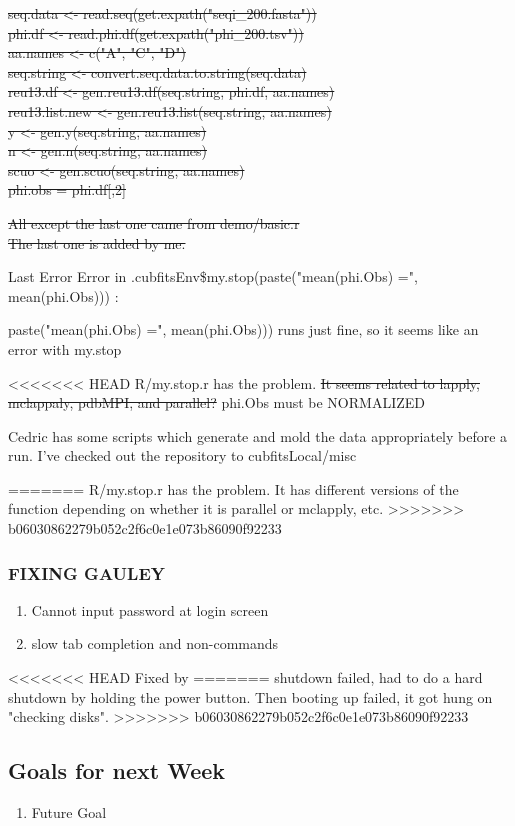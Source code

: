 \documentclass[11pt]{article} %
\begin{document}
\sout{seq.data <- read.seq(get.expath("seqi\_200.fasta"))\\
phi.df <- read.phi.df(get.expath("phi\_200.tsv"))\\
aa.names <- c("A", "C", "D")\\
seq.string <- convert.seq.data.to.string(seq.data)\\
reu13.df <- gen.reu13.df(seq.string, phi.df, aa.names)\\
reu13.list.new <- gen.reu13.list(seq.string, aa.names)\\
y <- gen.y(seq.string, aa.names)\\
n <- gen.n(seq.string, aa.names)\\
scuo <- gen.scuo(seq.string, aa.names) \\
phi.obs = phi.df[,2]}

\sout{All except the last one came from demo/basic.r\\The last one is added by me.}


Last Error
Error in .cubfitsEnv\$my.stop(paste("mean(phi.Obs) =", mean(phi.Obs))) : 

paste("mean(phi.Obs) =", mean(phi.Obs))) runs just fine, so it seems like an error with my.stop

<<<<<<< HEAD
R/my.stop.r has the problem. \sout{It seems related to lapply, mclappaly, pdbMPI, and parallel?} phi.Obs must be NORMALIZED

Cedric has some scripts which generate and mold the data appropriately before a run. I've checked out the repository to cubfitsLocal/misc



=======
R/my.stop.r has the problem. It has different versions of the function depending on whether it is parallel or mclapply, etc.
>>>>>>> b06030862279b052c2f6c0e1e073b86090f92233

\subsubsection{FIXING GAULEY}
\begin{enumerate}
item Slow Login
\item Cannot input password at login screen
\item slow tab completion and non-commands
\end{enumerate}

<<<<<<< HEAD
Fixed by 
=======
shutdown failed, had to do a hard shutdown by holding the power button. Then booting up failed, it got hung on "checking disks".
>>>>>>> b06030862279b052c2f6c0e1e073b86090f92233

\subsection{Goals for next Week}
\begin{enumerate}
\item Future Goal
\end{enumerate}
\end{document}
